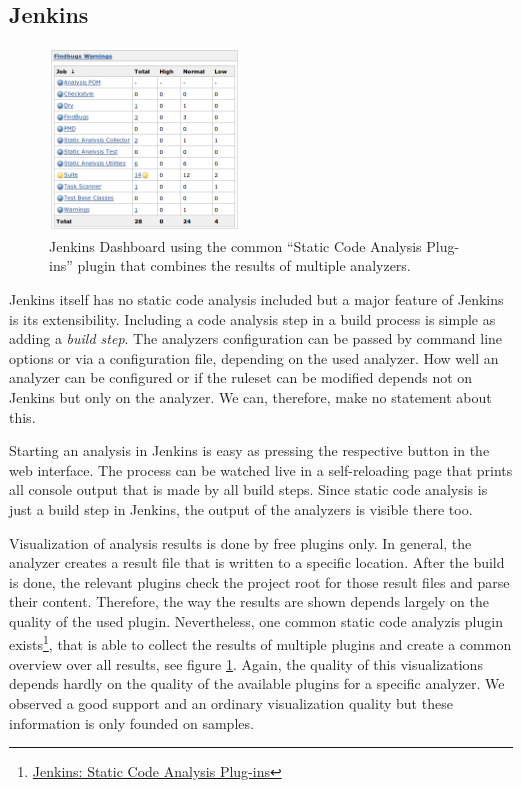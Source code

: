 \documentclass[conference]{IEEEtran}
\begin{document}
\subsection{Jenkins}
\label{subsec:evaluation_jenkins}

\begin{figure}[t]
	\centering
	\includegraphics[width=0.45\textwidth]{img/jenkins_dashboard.png}
	\caption{Jenkins Dashboard using the common ``Static Code Analysis Plug-ins'' plugin that combines the results of multiple analyzers.}
	\label{fig:jenkins-dashboard}
\end{figure}

Jenkins itself has no static code analysis included but a major feature of Jenkins is its extensibility. Including a code analysis step in a build process is simple as adding a \textit{build step}. The analyzers configuration can be passed by command line options or via a configuration file, depending on the used analyzer. How well an analyzer can be configured or if the ruleset can be modified depends not on Jenkins but only on the analyzer. We can, therefore, make no statement about this.

Starting an analysis in Jenkins is easy as pressing the respective button in the web interface. The process can be watched live in a self-reloading page that prints all console output that is made by all build steps. Since static code analysis is just a build step in Jenkins, the output of the analyzers is visible there too.

Visualization of analysis results is done by free plugins only. In general, the analyzer creates a result file that is written to a specific location. After the build is done, the relevant plugins check the project root for those result files and parse their content. Therefore, the way the results are shown depends largely on the quality of the used plugin. Nevertheless, one common static code analyzis plugin exists\footnote{\href{https://wiki.jenkins-ci.org/display/JENKINS/Static+Code+Analysis+Plug-ins}{Jenkins: Static Code Analysis Plug-ins}}, that is able to collect the results of multiple plugins and create a common overview over all results, see figure \ref{fig:jenkins-dashboard}. Again, the quality of this visualizations depends hardly on the quality of the available plugins for a specific analyzer. We observed a good support and an ordinary visualization quality but these information is only founded on samples.
\end{document}
